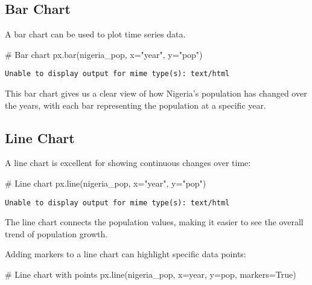 \documentclass[
  letterpaper,
  DIV=11,
  numbers=noendperiod]{scrreprt}
\newenvironment{Shaded}{\begin{snugshade}}{\end{snugshade}}
\newcommand{\CommentTok}[1]{\textcolor[rgb]{0.37,0.37,0.37}{#1}}
\newcommand{\NormalTok}[1]{\textcolor[rgb]{0.00,0.23,0.31}{#1}}
\newcommand{\OperatorTok}[1]{\textcolor[rgb]{0.37,0.37,0.37}{#1}}
\newcommand{\StringTok}[1]{\textcolor[rgb]{0.13,0.47,0.30}{#1}}
\newcommand{\VariableTok}[1]{\textcolor[rgb]{0.07,0.07,0.07}{#1}}
\begin{document}
\subsection{Bar Chart}\label{bar-chart-1}

A bar chart can be used to plot time series data.

\begin{Shaded}
\begin{Highlighting}[]
\CommentTok{\# Bar chart}
\NormalTok{px.bar(nigeria\_pop, x}\OperatorTok{=}\StringTok{"year"}\NormalTok{, y}\OperatorTok{=}\StringTok{"pop"}\NormalTok{)}
\end{Highlighting}
\end{Shaded}

\begin{verbatim}
Unable to display output for mime type(s): text/html
\end{verbatim}

This bar chart gives us a clear view of how Nigeria's population has
changed over the years, with each bar representing the population at a
specific year.

\subsection{Line Chart}\label{line-chart}

A line chart is excellent for showing continuous changes over time:

\begin{Shaded}
\begin{Highlighting}[]
\CommentTok{\# Line chart}
\NormalTok{px.line(nigeria\_pop, x}\OperatorTok{=}\StringTok{"year"}\NormalTok{, y}\OperatorTok{=}\StringTok{"pop"}\NormalTok{)}
\end{Highlighting}
\end{Shaded}

\begin{verbatim}
Unable to display output for mime type(s): text/html
\end{verbatim}

The line chart connects the population values, making it easier to see
the overall trend of population growth.

Adding markers to a line chart can highlight specific data points:

\begin{Shaded}
\begin{Highlighting}[]
\CommentTok{\# Line chart with points}
\NormalTok{px.line(nigeria\_pop, x}\OperatorTok{=}\StringTok{\textquotesingle{}year\textquotesingle{}}\NormalTok{, y}\OperatorTok{=}\StringTok{\textquotesingle{}pop\textquotesingle{}}\NormalTok{, markers}\OperatorTok{=}\VariableTok{True}\NormalTok{)}
\end{Highlighting}
\end{Shaded}
\end{document}
